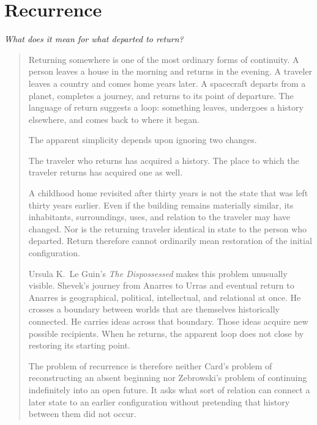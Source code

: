 \documentclass[
  11pt,
  a4paper,
  DIV=12,
  BCOR=0mm,
  parskip=half-
]{scrartcl}
\theoremstyle{definition}
\theoremstyle{plain}
\theoremstyle{remark}
\newcommand{\movementquestion}[1]{%
  \begin{center}
    \small\itshape
    #1
  \end{center}
  \medskip
}
\newenvironment{orientation}
  {%
    \begin{quote}
    \small
    \setlength{\parindent}{1em}
  }
  {%
    \end{quote}
  }
\begin{document}

\section{Recurrence}
\label{mov:recurrence}

\movementquestion{What does it mean for what departed to return?}

\begin{orientation}
Returning somewhere is one of the most ordinary forms of continuity. A person
leaves a house in the morning and returns in the evening. A traveler leaves a
country and comes home years later. A spacecraft departs from a planet,
completes a journey, and returns to its point of departure. The language of
return suggests a loop: something leaves, undergoes a history elsewhere, and
comes back to where it began.

The apparent simplicity depends upon ignoring two changes.

The traveler who returns has acquired a history. The place to which the
traveler returns has acquired one as well.

A childhood home revisited after thirty years is not the state that was left
thirty years earlier. Even if the building remains materially similar, its
inhabitants, surroundings, uses, and relation to the traveler may have
changed. Nor is the returning traveler identical in state to the person who
departed. Return therefore cannot ordinarily mean restoration of the initial
configuration.

Ursula K.\ Le Guin's \emph{The Dispossessed} makes this problem unusually
visible. Shevek's journey from Anarres to Urras and eventual return to Anarres
is geographical, political, intellectual, and relational at once. He crosses
a boundary between worlds that are themselves historically connected. He
carries ideas across that boundary. Those ideas acquire new possible
recipients. When he returns, the apparent loop does not close by restoring its
starting point.

The problem of recurrence is therefore neither Card's problem of reconstructing
an absent beginning nor Zebrowski's problem of continuing indefinitely into an
open future. It asks what sort of relation can connect a later state to an
earlier configuration without pretending that history between them did not
occur.
\end{orientation}
\end{document}
